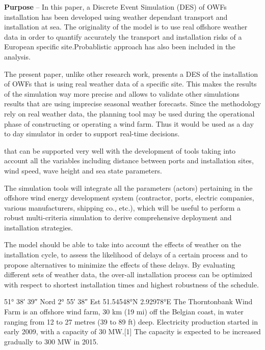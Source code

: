 \textbf{Purpose} --
In this paper, a Discrete Event Simulation (DES) of OWFs installation has been developed using weather dependant transport and installation at sea. The originality of the model is to use real offshore weather data in order to quantify accurately the transport and installation risks of a European specific site.Probablistic approach has also been included in the analysis.


The present paper, unlike other research work, presents a DES of the installation of OWFs that is using real weather data of a specific site. This makes the results of the simulation way more precise and allows to validate other simulations results that are using imprecise seasonal weather forecasts. Since the methodology rely on real weather data, the planning tool may be used during the operational phase of constructing or operating a wind farm. Thus it would be used as a day to day simulator in order to support real-time decisions.

that can be supported very well with the development of tools taking into account all the variables including distance between ports and installation sites, wind speed, wave height and sea state parameters.

The simulation tools will integrate all the parameters (actors) pertaining in the offshore wind energy development system (contractor, ports, electric companies, various manufacturers, shipping co., etc.), which will be useful to perform a robust multi-criteria simulation to derive comprehensive deployment and installation strategies.

The model should be able to take into account the effects of weather on the installation cycle, to assess the likelihood of delays of a certain process and to propose alternatives to minimize the effects of these delays. By evaluating different sets of weather data, the over-all installation process can be optimized with respect to shortest installation times and highest robustness of the schedule.


51° 38′ 39″ Nord 2° 55′ 38″ Est
51.54548°N 2.92978°E
The Thorntonbank Wind Farm is an offshore wind farm, 30 km (19 mi) off the Belgian coast, in water ranging from 12 to 27 metres (39 to 89 ft) deep. Electricity production started in early 2009, with a capacity of 30 MW.[1] The capacity is expected to be increased gradually to 300 MW in 2015.